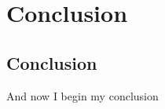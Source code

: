 \chapter{Conclusion}

\ifpdf
    \graphicspath{{Chapter4/Figs/Raster/}{Chapter4/Figs/PDF/}{Chapter3/Figs/}}
\else
    \graphicspath{{Chapter4/Figs/Vector/}{Chapter4/Figs/}}
\fi

\section{Conclusion}
And now I begin my conclusion